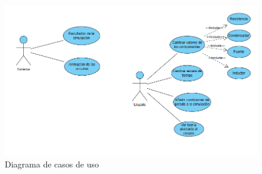 \documentclass[../main.tex]{subfiles}
\begin{document}
\begin{figure}
    \centering
    \includegraphics{images/casos_de_uso.PNG}
    \caption{Diagrama de casos de uso}
    \label{fig::casos_de_uso}
\end{figure}
\end{document}
